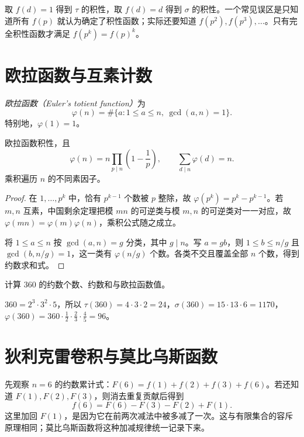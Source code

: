 取 $f(d)=1$ 得到 $\tau$ 的积性，取 $f(d)=d$ 得到 $\sigma$ 的积性。一个常见误区是只知道所有 $f(p)$ 就认为确定了积性函数；实际还要知道 $f(p^2),f(p^3),\ldots$。只有完全积性函数才满足 $f(p^k)=f(p)^k$。

\section{欧拉函数与互素计数}

\begin{definition}
\emph{欧拉函数（Euler's totient function）}为
\[
 \varphi(n)=\#\{a:1\le a\le n,\ \gcd(a,n)=1\}.
\]
特别地，$\varphi(1)=1$。
\end{definition}

\begin{theorem}
\label{thm:totient}
欧拉函数积性，且
\begin{equation}
 \varphi(n)=n\prod_{p\mid n}\left(1-\frac1p\right),
 \qquad \sum_{d\mid n}\varphi(d)=n.
 \label{eq:totient-product}
\end{equation}
乘积遍历 $n$ 的不同素因子。
\end{theorem}
\begin{proof}
在 $1,\ldots,p^k$ 中，恰有 $p^{k-1}$ 个数被 $p$ 整除，故 $\varphi(p^k)=p^k-p^{k-1}$。若 $m,n$ 互素，中国剩余定理把模 $mn$ 的可逆类与模 $m,n$ 的可逆类对一一对应，故 $\varphi(mn)=\varphi(m)\varphi(n)$，乘积公式随之成立。

将 $1\le a\le n$ 按 $\gcd(a,n)=g$ 分类，其中 $g\mid n$。写 $a=gb$，则 $1\le b\le n/g$ 且 $\gcd(b,n/g)=1$，这一类有 $\varphi(n/g)$ 个数。各类不交且覆盖全部 $n$ 个数，得到约数求和式。
\end{proof}

\begin{example}
计算 $360$ 的约数个数、约数和与欧拉函数值。
\end{example}
\begin{solve}
$360=2^3\cdot3^2\cdot5$，所以 $\tau(360)=4\cdot3\cdot2=24$，$\sigma(360)=15\cdot13\cdot6=1170$，$\varphi(360)=360\cdot\frac12\cdot\frac23\cdot\frac45=96$。
\end{solve}

\section{狄利克雷卷积与莫比乌斯函数}

先观察 $n=6$ 的约数累计式：$F(6)=f(1)+f(2)+f(3)+f(6)$。若还知道 $F(1),F(2),F(3)$，则消去重复贡献后得到
\[
 f(6)=F(6)-F(3)-F(2)+F(1).
\]
这里加回 $F(1)$，是因为它在前两次减法中被多减了一次。这与有限集合的容斥原理相同；莫比乌斯函数将这种加减规律统一记录下来。

